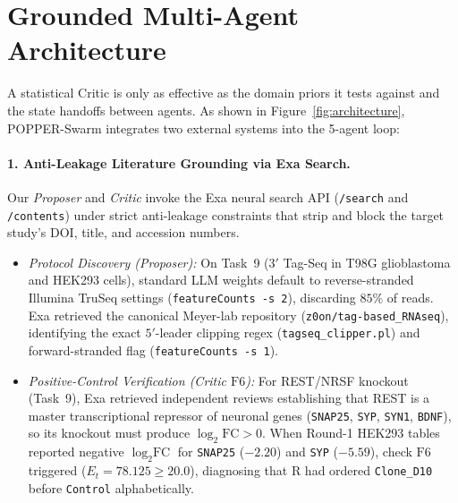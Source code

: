 \documentclass[10pt,twocolumn]{article}
\begin{document}
\section{Grounded Multi-Agent Architecture}
\label{sec:architecture}

A statistical Critic is only as effective as the domain priors it tests against and the state handoffs between agents. As shown in Figure~\ref{fig:architecture}, POPPER-Swarm integrates two external systems into the 5-agent loop:

\paragraph{1. Anti-Leakage Literature Grounding via Exa Search.}
Our \emph{Proposer} and \emph{Critic} invoke the Exa neural search API (\texttt{/search} and \texttt{/contents}) under strict anti-leakage constraints that strip and block the target study's DOI, title, and accession numbers.
\begin{itemize}[leftmargin=14pt,itemsep=2pt]
    \item \emph{Protocol Discovery (Proposer):} On Task~9 ($3'$ Tag-Seq in T98G glioblastoma and HEK293 cells), standard LLM weights default to reverse-stranded Illumina TruSeq settings (\texttt{featureCounts -s 2}), discarding $85\%$ of reads. Exa retrieved the canonical Meyer-lab repository (\texttt{z0on/tag-based\_RNAseq}), identifying the exact $5'$-leader clipping regex (\texttt{tagseq\_clipper.pl}) and forward-stranded flag (\texttt{featureCounts -s 1}).
    \item \emph{Positive-Control Verification (Critic $\text{F6}$):} For REST/NRSF knockout (Task~9), Exa retrieved independent reviews establishing that REST is a master transcriptional repressor of neuronal genes (\texttt{SNAP25}, \texttt{SYP}, \texttt{SYN1}, \texttt{BDNF}), so its knockout must produce $\log_2\text{FC} > 0$. When Round-1 HEK293 tables reported negative $\log_2\text{FC}$ for \texttt{SNAP25} ($-2.20$) and \texttt{SYP} ($-5.59$), check $\text{F6}$ triggered ($E_t = 78.125 \ge 20.0$), diagnosing that R had ordered \texttt{Clone\_D10} before \texttt{Control} alphabetically.
\end{itemize}
\end{document}
